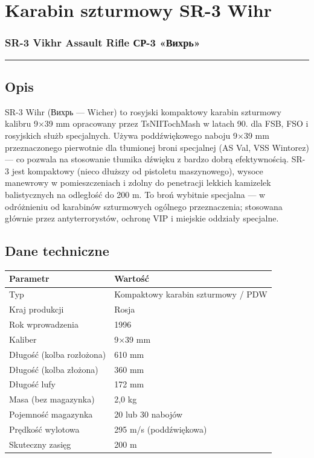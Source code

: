 \documentclass[12pt,openany,oneside]{book}
\begin{document}
\chapter{Karabin szturmowy SR-3 Wihr}\label{karabin-szturmowy-sr-3-wihr}

\subsection{SR-3 Vikhr Assault Rifle \textbar{} СР-3
«Вихрь»}\label{sr-3-vikhr-assault-rifle-ux441ux440-3-ux432ux438ux445ux440ux44c}

\begin{center}\rule{0.5\linewidth}{0.5pt}\end{center}

\section{Opis}\label{opis-52}

SR-3 Wihr (Вихрь --- Wicher) to rosyjski kompaktowy karabin szturmowy
kalibru 9×39 mm opracowany przez TsNIITochMash w latach 90. dla FSB, FSO
i rosyjskich służb specjalnych. Używa poddźwiękowego naboju 9×39 mm
przeznaczonego pierwotnie dla tłumionej broni specjalnej (AS Val, VSS
Wintorez) --- co pozwala na stosowanie tłumika dźwięku z bardzo dobrą
efektywnością. SR-3 jest kompaktowy (nieco dłuższy od pistoletu
maszynowego), wysoce manewrowy w pomieszczeniach i zdolny do penetracji
lekkich kamizelek balistycznych na odległość do 200 m. To broń wybitnie
specjalna --- w odróżnieniu od karabinów szturmowych ogólnego
przeznaczenia; stosowana głównie przez antyterrorystów, ochronę VIP i
miejskie oddziały specjalne.

\section{Dane techniczne}\label{dane-techniczne-52}

\begin{longtable}[]{@{}ll@{}}
\toprule\noalign{}
Parametr & Wartość \\
\midrule\noalign{}
\endhead
\bottomrule\noalign{}
\endlastfoot
Typ & Kompaktowy karabin szturmowy / PDW \\
Kraj produkcji & Rosja \\
Rok wprowadzenia & 1996 \\
Kaliber & 9×39 mm \\
Długość (kolba rozłożona) & 610 mm \\
Długość (kolba złożona) & 360 mm \\
Długość lufy & 172 mm \\
Masa (bez magazynka) & 2,0 kg \\
Pojemność magazynka & 20 lub 30 nabojów \\
Prędkość wylotowa & 295 m/s (poddźwiękowa) \\
Skuteczny zasięg & 200 m \\
\end{longtable}
\end{document}
